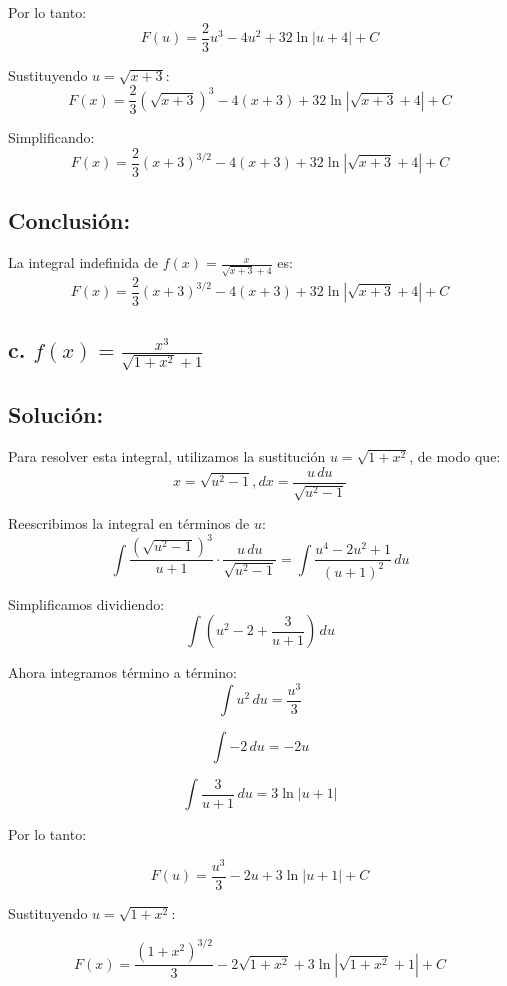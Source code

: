 \documentclass{article}
\begin{document}
\noindent Por lo tanto:
\[
F(u) = \frac{2}{3}u^3 - 4u^2 + 32 \ln|u+4| + C
\]

\noindent Sustituyendo \( u = \sqrt{x+3} \):
\[
F(x) = \frac{2}{3}(\sqrt{x+3})^3 - 4(x+3) + 32 \ln|\sqrt{x+3} + 4| + C
\]

\noindent Simplificando:
\[
F(x) = \frac{2}{3}(x+3)^{3/2} - 4(x+3) + 32 \ln|\sqrt{x+3} + 4| + C
\]

\subsection*{Conclusión:}

La integral indefinida de \( f(x) = \frac{x}{\sqrt{x+3} + 4} \) es:
\[
F(x) = \frac{2}{3}(x+3)^{3/2} - 4(x+3) + 32 \ln|\sqrt{x+3} + 4| + C
\]

\subsection*{\newline c. \(f(x) = \frac{x^3}{\sqrt{1+x^2} + 1}\)}
\subsection*{Solución: }

Para resolver esta integral, utilizamos la sustitución \( u = \sqrt{1+x^2} \), de modo que:
\[
x = \sqrt{u^2 - 1},  dx = \frac{u \, du}{\sqrt{u^2 - 1}}
\]

\noindent \newline Reescribimos la integral en términos de \( u \):
\[
\int \frac{(\sqrt{u^2 - 1})^3}{u + 1} \cdot \frac{u \, du}{\sqrt{u^2 - 1}} = \int \frac{u^4 - 2u^2 + 1}{(u + 1)^2} \, du
\]

\noindent Simplificamos dividiendo:
\[
\int \left( u^2 - 2 + \frac{3}{u+1} \right) \, du
\]

\noindent Ahora integramos término a término:
\[
\int u^2 \, du = \frac{u^3}{3}
\]

\[
\int -2 \, du = -2u
\]

\[
\int \frac{3}{u+1} \, du = 3 \ln|u+1|
\]

\noindent Por lo tanto:

\[
F(u) = \frac{u^3}{3} - 2u + 3 \ln|u+1| + C
\]

\noindent \newline Sustituyendo \( u = \sqrt{1+x^2} \):

\[
F(x) = \frac{(1+x^2)^{3/2}}{3} - 2\sqrt{1+x^2} + 3 \ln|\sqrt{1+x^2} + 1| + C
\]
\end{document}
